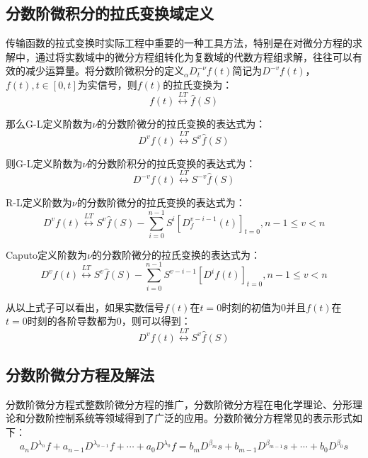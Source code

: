 \subsection{分数阶微积分的拉氏变换域定义}
传输函数的拉式变换时实际工程中重要的一种工具方法，特别是在对微分方程的求解中，通过将实数域中的微分方程组转化为复数域的代数方程组求解，往往可以有效的减少运算量。将分数阶微积分的定义${}_{\alpha }D_{t}^{-\nu }f(t)$简记为${{D}^{-v}}f(t)$，$f(t),t\in \left[ 0,t \right]$为实信号，则$f(t)$的拉氏变换为：
\begin{equation}
f(t)\overset{LT}{\longleftrightarrow}\widehat{f}\left( S \right)
\end{equation}

那么G-L定义阶数为$\nu $的分数阶微分的拉氏变换的表达式为：
\begin{equation}
{{D}^{v}}f(t)\overset{LT}{\longleftrightarrow}{{S}^{v}}\widehat{f}\left( S \right)
\end{equation}

则G-L定义阶数为$\nu $的分数阶积分的拉氏变换的表达式为：
\begin{equation}
{{D}^{-v}}f(t)\overset{LT}{\longleftrightarrow}{{S}^{-v}}\widehat{f}\left( S \right)
\end{equation}
	 
R-L定义阶数为$\nu $的分数阶微分的拉氏变换的表达式为：
\begin{equation}
{{D}^{v}}f(t)\overset{LT}{\longleftrightarrow}{{S}^{v}}\widehat{f}\left( S \right)-\sum\limits_{i=0}^{n-1}{{{S}^{i}}{{\left[ D_{f}^{v-i-1}\left( t \right) \right]}_{t=0}},n-1\le v<n}
\end{equation}
	 
Caputo定义阶数为$\nu $的分数阶微分的拉氏变换的表达式为：
\begin{equation}
{{D}^{v}}f(t)\overset{LT}{\longleftrightarrow}{{S}^{v}}\widehat{f}\left( S \right)-\sum\limits_{i=0}^{n-1}{{{S}^{v-i-1}}{{\left[ {{D}^{i}}f\left( t \right) \right]}_{t=0}},n-1\le v<n}
\end{equation}
	 
从以上式子可以看出，如果实数信号$f(t)$在$t=0$时刻的初值为0并且$f(t)$在$t=0$时刻的各阶导数都为0，则可以得到：
\begin{equation}
{{D}^{v}}f(t)\overset{LT}{\longleftrightarrow}{{S}^{v}}\widehat{f}\left( S \right)
\end{equation}
\subsection{分数阶微分方程及解法}
分数阶微分方程式整数阶微分方程的推广，分数阶微分方程在电化学理论、分形理论和分数阶控制系统等领域得到了广泛的应用。分数阶微分方程常见的表示形式如下：
\begin{equation}
{{a}_{n}}{{D}^{{{\lambda }_{n}}}}f+{{a}_{n-1}}{{D}^{{{\lambda }_{n-1}}}}f+\cdots +{{a}_{0}}{{D}^{{{\lambda }_{0}}}}f={{b}_{m}}{{D}^{{{\beta }_{m}}}}s+{{b}_{m-1}}{{D}^{{{\beta }_{m-1}}}}s+\cdots +{{b}_{0}}{{D}^{{{\beta }_{0}}}}s
\end{equation}

